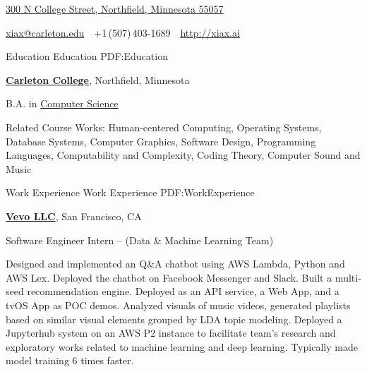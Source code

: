 \documentclass[letterpaper,MMMyyyy,nonstopmode]{simpleresumecv}
\newcommand{\CVAuthor}{Xingfan Xia}
\newcommand{\CVWebpage}{http://xiax.ai}
\begin{document}

\Title{\CVAuthor}

\begin{SubTitle}
\href{https://www.google.com/maps/place/300+N+College+Street,+Northfield,+Minnesota+55057}
{300 N College Street, Northfield, Minnesota 55057}
\par
\href{mailto:xiax@carleton.edu}
{xiax@carleton.edu}
\,\SubBulletSymbol\,
+1\,(507)\,403-1689
\,\SubBulletSymbol\,
\href{\CVWebpage}
{\url{\CVWebpage}}
\end{SubTitle}

\begin{Body}


\Section
{Education}
{Education}
{PDF:Education}

\Entry
\href{https://www.carleton.edu/}
{\textbf{Carleton College}},
Northfield, Minnesota

\Gap
\BulletItem
B.A. in 
\href{https://apps.carleton.edu/curricular/cs/}
{Computer Science}
\hfill
{}
\begin{Detail}
\SubBulletItem
Related Course Works: Human-centered Computing, Operating Systems, Database Systems, Computer Graphics, Software Design, Programming Languages, Computability and Complexity, Coding Theory, Computer Sound and Music

\end{Detail}


\Section
{Work\newline
Experience}
{Work Experience}
{PDF:WorkExperience}

\Entry
\href{http://hq.vevo.com/}
{\textbf{Vevo LLC}},
San Francisco, CA

\Gap
\BulletItem
Software Engineer Intern 
\hfill
{} --
\newline
(Data \& Machine Learning Team)
\begin{Detail}
\SubBulletItem
Designed and implemented an Q\&A chatbot using AWS Lambda, Python and AWS Lex. Deployed the chatbot on Facebook Messenger and Slack.
\SubBulletItem
Built a multi-seed recommendation engine. Deployed as an API service, a Web App, and a tvOS App as POC demos.
\SubBulletItem
Analyzed visuals of music videos, generated playlists based on similar visual elements grouped by LDA topic modeling.
\SubBulletItem
Deployed a Jupyterhub system on an AWS P2 instance to facilitate team's research and exploratory works related to machine learning and deep learning. Typically made model training 6 times faster.
\end{Detail}


\end{Body}
\end{document}
